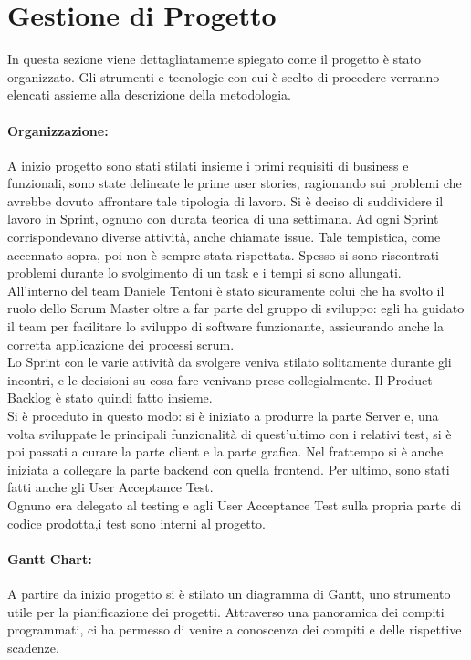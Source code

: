 \section{Gestione di Progetto}
In questa sezione viene dettagliatamente spiegato come il progetto è stato organizzato. Gli strumenti e tecnologie con cui è scelto di procedere verranno elencati assieme alla descrizione della metodologia.
    \paragraph{Organizzazione: }
    A inizio progetto sono stati stilati insieme i primi requisiti di business e funzionali, sono state delineate le prime user stories, ragionando sui problemi che avrebbe dovuto affrontare tale tipologia di lavoro.
   Si è deciso di suddividere il lavoro in Sprint, ognuno con durata teorica di una settimana. Ad ogni Sprint corrispondevano diverse attività, anche chiamate issue. Tale tempistica, come accennato sopra, poi non è sempre stata rispettata. Spesso si sono riscontrati problemi durante lo svolgimento di un task e i tempi si sono allungati.\\
    All'interno del team Daniele Tentoni è stato sicuramente colui che ha svolto il ruolo dello Scrum Master oltre a far parte del gruppo di sviluppo: egli ha guidato il team per facilitare lo sviluppo di software funzionante, assicurando anche la corretta applicazione dei processi scrum.\\
    Lo Sprint con le varie attività da svolgere veniva stilato solitamente durante gli incontri, e le decisioni su cosa fare venivano prese collegialmente. Il Product Backlog è stato quindi fatto insieme.\\ 
    Si è proceduto in questo modo: si è iniziato a produrre la parte Server e, una volta sviluppate le principali funzionalità di quest'ultimo con i relativi test, si è poi passati a curare la parte client e la parte grafica. Nel frattempo si è anche iniziata a collegare la parte backend con quella frontend. Per ultimo, sono stati fatti anche gli User Acceptance Test.\\
    Ognuno era delegato al testing e agli User Acceptance Test sulla propria parte di codice prodotta,i test sono interni al progetto. 
    
    
    
    \paragraph{Gantt Chart: } 
    A partire da inizio progetto si è stilato un diagramma di Gantt, uno strumento utile per la pianificazione dei progetti. Attraverso una panoramica dei compiti programmati, ci ha permesso di venire a conoscenza dei compiti e delle rispettive scadenze.
    
